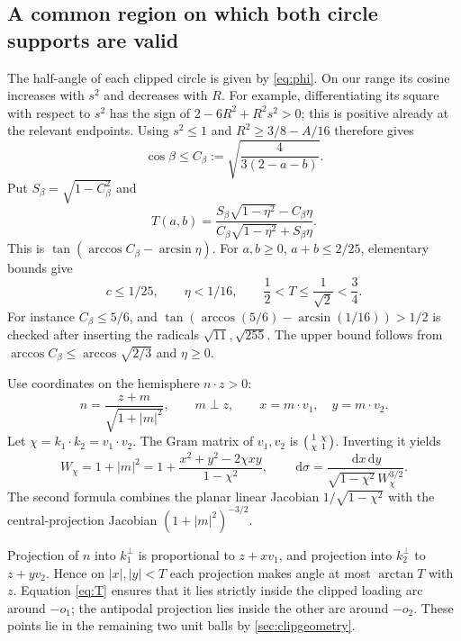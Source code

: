 \documentclass[11pt]{article}
\numberwithin{equation}{section}
\theoremstyle{definition}\newtheorem{definition}[theorem]{Definition}
\theoremstyle{remark}\newtheorem{remark}[theorem]{Remark}
\newcommand{\dd}{\,\mathrm d}
\begin{document}
\subsection{A common region on which both circle supports are valid}
The half-angle of each clipped circle is given by \cref{eq:phi}. On our
range its cosine increases with $s^2$ and decreases with $R$. For example,
differentiating its square with respect to $s^2$ has the sign of
$2-6R^2+R^2s^2>0$; this is positive already at the relevant endpoints.
Using $s^2\le1$ and $R^2\ge3/8-A/16$ therefore gives
\[
 \cos\beta\le C_\beta:=\sqrt{\frac4{3(2-a-b)}}.
\]
Put $S_\beta=\sqrt{1-C_\beta^2}$ and
\begin{equation}\label{eq:T}
 T(a,b)=\frac{S_\beta\sqrt{1-\eta^2}-C_\beta\eta}
              {C_\beta\sqrt{1-\eta^2}+S_\beta\eta}.
\end{equation}
This is $\tan(\arccos C_\beta-\arcsin\eta)$.
For $a,b\ge0$, $a+b\le2/25$, elementary bounds give
\begin{equation}\label{eq:Tbds}
 c\le1/25,\qquad\eta<1/16,\qquad
 \frac12<T\le\frac1{\sqrt2}<\frac34.
\end{equation}
For instance $C_\beta\le5/6$, and
$\tan(\arccos(5/6)-\arcsin(1/16))>1/2$ is checked after inserting the
radicals $\sqrt{11},\sqrt{255}$. The upper bound follows from
$\arccos C_\beta\le\arccos\sqrt{2/3}$ and $\eta\ge0$.

Use coordinates on the hemisphere $n\cdot z>0$:
\begin{equation}\label{eq:projective}
 n=\frac{z+m}{\sqrt{1+|m|^2}},\qquad m\perp z,\qquad
 x=m\cdot v_1,\quad y=m\cdot v_2.
\end{equation}
Let $\chi=k_1\cdot k_2=v_1\cdot v_2$. The Gram matrix of $v_1,v_2$ is
$\begin{psmallmatrix}1&\chi\\\chi&1\end{psmallmatrix}$. Inverting it yields
\begin{equation}\label{eq:Wchi}
 W_\chi=1+|m|^2
   =1+\frac{x^2+y^2-2\chi xy}{1-\chi^2},\qquad
 \dd\sigma=\frac{\dd x\dd y}{\sqrt{1-\chi^2}\,W_\chi^{3/2}}.
\end{equation}
The second formula combines the planar linear Jacobian
$1/\sqrt{1-\chi^2}$ with the central-projection Jacobian
$(1+|m|^2)^{-3/2}$.

Projection of $n$ into $k_1^\perp$ is proportional to $z+xv_1$, and
projection into $k_2^\perp$ to $z+yv_2$. Hence on $|x|,|y|<T$ each
projection makes angle at most $\arctan T$ with $z$. Equation \cref{eq:T}
ensures that it lies strictly inside the clipped loading arc around
$-o_1$; the antipodal projection lies inside the other arc around $-o_2$.
These points lie in the remaining two unit balls by \cref{sec:clipgeometry}.
\end{document}
